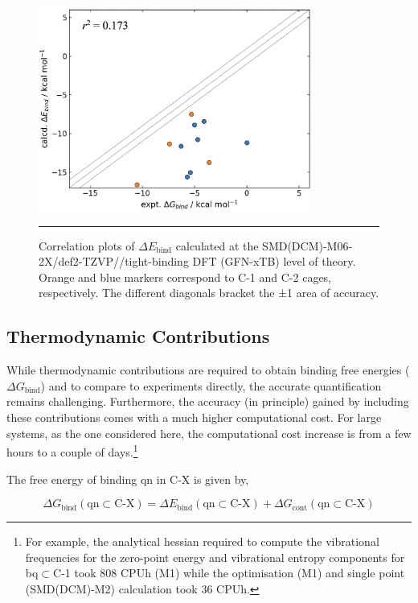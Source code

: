 \documentclass[../../main.tex]{subfiles}
\begin{document}
\begin{figure}[h!]
	\vspace{0.4cm}
	\centering
	\includegraphics[width=9cm]{3/da//figs/figS11}
	\vspace{0.2cm}
	\hrule
	\caption{Correlation plots of $\Delta E_\text{bind}$ calculated at the SMD(DCM)-M06-2X/def2-TZVP//tight-binding DFT (GFN-xTB) level of theory. Orange and blue markers correspond to C-1 and C-2 cages, respectively. The different diagonals bracket the ±1 \kcalx area of accuracy.}
	\label{fig::si_da_11}
\end{figure}

\clearpage  %
\subsection{Thermodynamic Contributions}
\label{section::da_si_3_3}

While thermodynamic contributions are required to obtain binding free energies ($\Delta G_\text{bind}$) and to compare to experiments directly, the accurate quantification remains challenging. Furthermore, the accuracy (in principle) gained by including these contributions comes with a much higher computational cost. For large systems, as the one considered here, the computational cost increase is from a few hours to a couple of days.\footnote{For example, the analytical hessian required to compute the vibrational frequencies for the zero-point energy and vibrational entropy components for bq$\subset$C-1 took 808 CPUh (M1) while the optimisation (M1) and single point (SMD(DCM)-M2) calculation took 36 CPUh.}

The free energy of binding qn in C-X is given by,

\begin{equation}
	\Delta G_\text{bind}(\text{qn}\subset\text{C-X}) =\Delta E_\text{bind} (\text{qn}\subset\text{C-X})+\Delta G_\text{cont}(\text{qn}\subset\text{C-X})
		\label{dg_bind}
	\end{equation}
	
\end{document}
